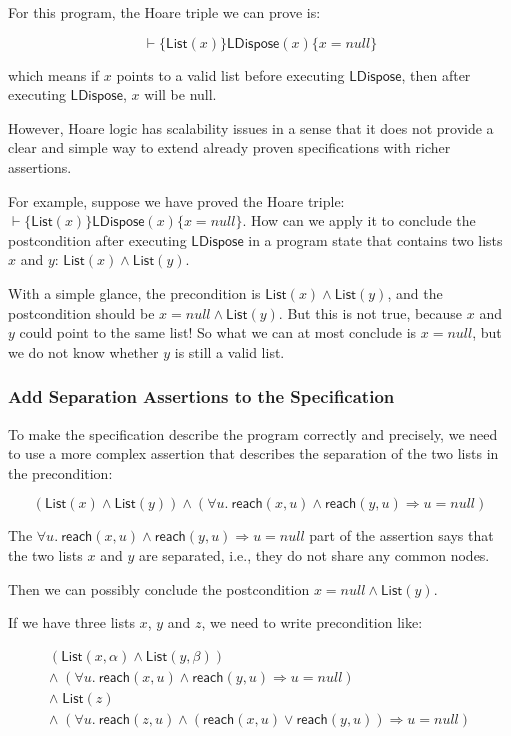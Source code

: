 \documentclass[11pt]{article}
\newcommand{\List}{\mathsf{List}}
\newcommand{\LDispose}{\mathsf{LDispose}}
\newcommand{\reach}{\mathsf{reach}}
\begin{document}
For this program, the Hoare triple we can prove is:

$$
\vdash \{ \List(x) \} \LDispose(x) \{ x = null \}
$$

which means if $x$ points to a valid list before executing $\LDispose$, then
after executing $\LDispose$, $x$ will be null.

However, Hoare logic has scalability issues in a sense that it does not provide
a clear and simple way to extend already proven specifications with richer
assertions.

For example, suppose we have proved the Hoare triple: $\vdash \{ \List(x) \}
\LDispose(x) \{ x = null \}$. 
How can we apply it to conclude the postcondition after executing $\LDispose$ in
a program state that contains two lists $x$ and $y$: $\List(x) \land \List(y)$.

With a simple glance, the precondition is $\List(x) \land \List(y)$, and the
postcondition should be $x = null \land \List(y)$.
But this is not true, because $x$ and $y$ could point to the same list! 
So what we can at most conclude is $x = null$, but we do not know whether $y$ is
still a valid list.

\subsubsection*{Add Separation Assertions to the Specification}
To make the specification describe the program correctly and precisely, we need
to use a more complex assertion that describes the separation of the two lists
in the precondition:

$$
(\List(x) \land \List(y)) \land
(\forall u.\ \reach(x, u) \land \reach(y, u) \Rightarrow u = null)
$$

The $\forall u.\ \reach(x, u) \land \reach(y, u) \Rightarrow u = null$ part of
the assertion says that the two lists $x$ and $y$ are separated, i.e., they do
not share any common nodes.

Then we can possibly conclude the postcondition $x = null \land \List(y)$.

If we have three lists $x$, $y$ and $z$, we need to write precondition like:

$$
\begin{array}{l}
(\List(x, \alpha) \land \List(y, \beta)) \\
\land\;(\forall u.\ \reach(x, u) \land \reach(y, u) \Rightarrow u = null) \\
\land\;\List(z) \\
\land\;(\forall u.\ \reach(z, u) \land (\reach(x, u) \lor \reach(y, u))
  \Rightarrow u = null)
\end{array}
$$
\end{document}
